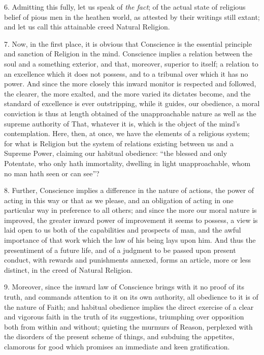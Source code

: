 6. Admitting this fully, let us speak of \emph{the fact}; of the
actual state of religious belief of pious men in the heathen world, as
attested by their writings still extant; and let us call this
attainable creed Natural Religion.

7. Now, in the first place, it is obvious that Conscience is the
essential principle and sanction of Religion in the mind. Conscience
implies a relation between the soul and a something exterior, and
that, moreover, superior to itself; a relation to an excellence which
it does not possess, and to a tribunal over which it has no power. And
since the more closely this inward monitor is respected and followed,
the clearer, the more exalted, and the more varied its dictates
become, and the standard of excellence is ever outstripping, while it
guides, our obedience, a moral conviction is thus at length obtained
of the unapproachable nature as well as the supreme authority of That,
whatever it is, which is the object of the mind's contemplation. Here,
then, at once, we have the elements of a religious system; for what is
Religion but the system of relations existing between us and a Supreme
Power, claiming our habitual obedience: ``the blessed and only
Potentate, who only hath immortality, dwelling in light
unapproachable, whom no man hath seen or can see''?

8. Further, Conscience implies a difference in the nature of
actions, the power of acting in this way or that as we please, and an
obligation of acting in one particular way in preference to all
others; and since the more our moral nature is improved, the greater
inward power of improvement it seems to possess, a view is laid open
to us both of the capabilities and prospects of man, and the awful
importance of that work which the law of his being lays upon him. And
thus the presentiment of a future life, and of a judgment to be passed
upon present conduct, with rewards and punishments annexed, forms an
article, more or less distinct, in the creed of Natural Religion.

9. Moreover, since the inward law of Conscience brings with it no
proof of its truth, and commands attention to it on its own authority,
all obedience to it is of the nature of Faith; and habitual obedience
implies the direct exercise of a clear and vigorous faith in the truth
of its suggestions, triumphing over opposition both from within and
without; quieting the murmurs of Reason, perplexed with the disorders
of the present scheme of things, and subduing the appetites, clamorous
for good which promises an immediate and keen gratification.


